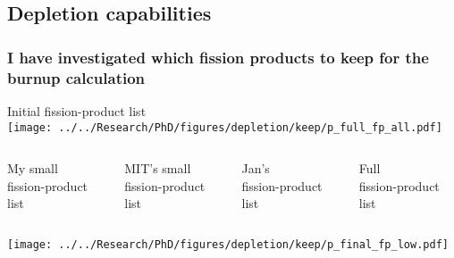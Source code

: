 \documentclass[compress,10pt]{beamer}
\begin{document}
\subsection{Depletion capabilities}

\typeout{***********************************************************************************}

\begin{frame}
    \frametitle{I have investigated which fission products to keep for the burnup calculation}

    \centering

    {\small Initial fission-product list} \\
    {}\texttt{[image: ../../Research/PhD/figures/depletion/keep/p\_full\_fp\_all.pdf]}

    \begin{columns}[t]


        \centering
        {\footnotesize My small\\ fission-product list}


        \centering
        {\footnotesize MIT's small\\ fission-product list}


        \centering
        {\footnotesize Jan's\\ fission-product list}


        \centering
        {\footnotesize Full\\ fission-product list}

    \end{columns}

    \begin{columns}[c]


        \centering
        {}\texttt{[image: ../../Research/PhD/figures/depletion/keep/p\_final\_fp\_low.pdf]} \\



\end{columns}
\end{frame}
\end{document}

